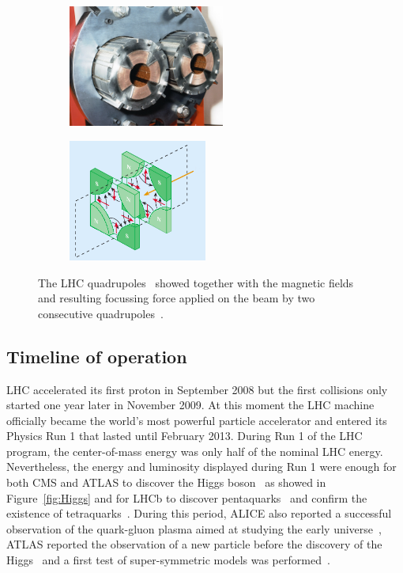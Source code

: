 \endgroup
	
	\begin{figure}[H]
		\begin{subfigure}{0.5\linewidth}
			\centering
			\includegraphics[height = 4cm]{fig/chapt2/LHC-quadrupole.jpg}
			\caption{\label{fig:LHCQuadrupole:A}}
		\end{subfigure}
		\begin{subfigure}{0.5\linewidth}
			\centering
			\includegraphics[height = 4cm]{fig/chapt2/LHC-quadrupole-field.png}
			\caption{\label{fig:LHCQuadrupole:B}}
		\end{subfigure}
		\caption{\label{fig:LHCQuadrupole} The LHC quadrupoles~ showed together with the magnetic fields and resulting focussing force applied on the beam by two consecutive quadrupoles~.}
	\end{figure}
	
	\subsection{Timeline of operation}
	\label{chapt2:ssec:timeline}
	
	LHC accelerated its first proton in September 2008 but the first collisions only started one year later in November 2009. At this moment the LHC machine officially became the world's most powerful particle accelerator and entered its Physics Run 1 that lasted until February 2013. During Run 1 of the LHC program, the center-of-mass energy was only half of the nominal LHC energy. Nevertheless, the energy and luminosity displayed during Run 1 were enough for both CMS and ATLAS to discover the Higgs boson~\cite{ATLAS2012,CMS2012} as showed in Figure~\ref{fig:Higgs} and for LHCb to discover pentaquarks~\cite{PENTAQUARK2015} and confirm the existence of tetraquarks~\cite{TETRAQUARK2017}. During this period, ALICE also reported a successful observation of the quark-gluon plasma aimed at studying the early universe~\cite{ALICEINFO}, ATLAS reported the observation of a new particle before the discovery of the Higgs~\cite{CHIB2012} and a first test of super-symmetric models was performed~\cite{B0SDECAY2013}.
	
